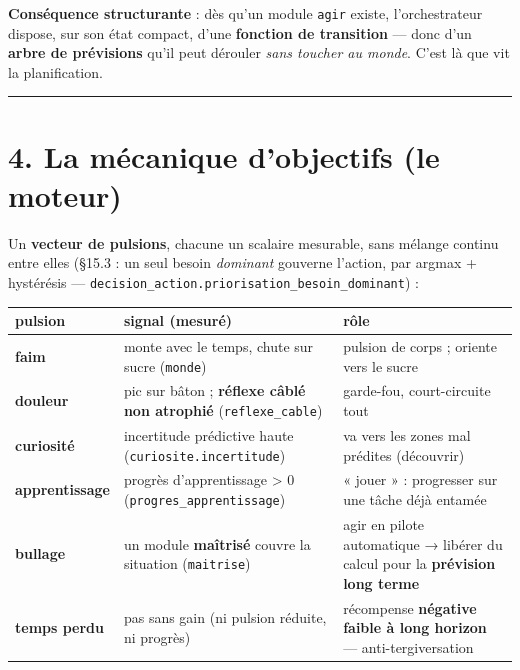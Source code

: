 \documentclass[
  french,
  11pt,
]{article}
\newcounter{none} %
\begin{document}
\textbf{Conséquence structurante} : dès qu'un module \texttt{agir}
existe, l'orchestrateur dispose, sur son état compact, d'une
\textbf{fonction de transition} --- donc d'un \textbf{arbre de
prévisions} qu'il peut dérouler \emph{sans toucher au monde}. C'est là
que vit la planification.

\begin{center}\rule{0.5\linewidth}{0.5pt}\end{center}

\section{4. La mécanique d'objectifs (le
moteur)}\label{la-muxe9canique-dobjectifs-le-moteur}

Un \textbf{vecteur de pulsions}, chacune un scalaire mesurable, sans
mélange continu entre elles (§15.3 : un seul besoin \emph{dominant}
gouverne l'action, par argmax + hystérésis ---
\texttt{decision\_action.priorisation\_besoin\_dominant}) :

{\def\LTcaptype{none} %
\begin{longtable}[]{@{}
  >{\raggedright\arraybackslash}p{}
  >{\raggedright\arraybackslash}p{}
  >{\raggedright\arraybackslash}p{}@{}}
\toprule\noalign{}
\begin{minipage}[b]{\linewidth}\raggedright
pulsion
\end{minipage} & \begin{minipage}[b]{\linewidth}\raggedright
signal (mesuré)
\end{minipage} & \begin{minipage}[b]{\linewidth}\raggedright
rôle
\end{minipage} \\
\midrule\noalign{}
\endhead
\bottomrule\noalign{}
\endlastfoot
\textbf{faim} & monte avec le temps, chute sur sucre (\texttt{monde}) &
pulsion de corps ; oriente vers le sucre \\
\textbf{douleur} & pic sur bâton ; \textbf{réflexe câblé non atrophié}
(\texttt{reflexe\_cable}) & garde-fou, court-circuite tout \\
\textbf{curiosité} & incertitude prédictive haute
(\texttt{curiosite.incertitude}) & va vers les zones mal prédites
(découvrir) \\
\textbf{apprentissage} & progrès d'apprentissage \textgreater{} 0
(\texttt{progres\_apprentissage}) & « jouer » : progresser sur une tâche
déjà entamée \\
\textbf{bullage} & un module \textbf{maîtrisé} couvre la situation
(\texttt{maitrise}) & agir en pilote automatique → libérer du calcul
pour la \textbf{prévision long terme} \\
\textbf{temps perdu} & pas sans gain (ni pulsion réduite, ni progrès) &
récompense \textbf{négative faible à long horizon} ---
anti-tergiversation \\
\end{longtable}
}
\end{document}
